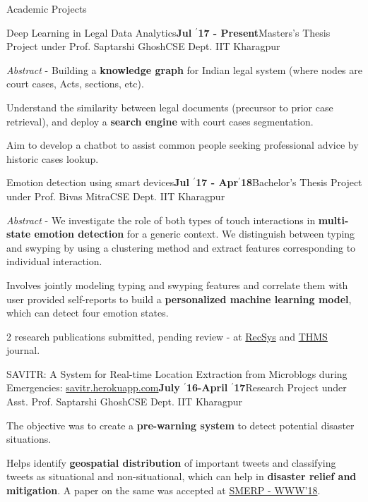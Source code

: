 \documentclass{resume} %
\begin{document}
\begin{rSection}{Academic Projects}

\begin{rSubsection}{ \large Deep Learning in Legal Data Analytics}{\textbf{\large Jul $^{\prime}$17 - Present}}{Masters's Thesis Project under Prof. Saptarshi Ghosh}{CSE Dept. IIT Kharagpur}
\item \textit{Abstract} - Building a \textbf{knowledge graph} for Indian legal system (where nodes are court cases, Acts, sections, etc).
\item Understand the similarity between legal documents (precursor to prior case retrieval), and deploy a \textbf{search engine} with court cases segmentation.
\item Aim to develop a chatbot to assist common people seeking professional advice by historic cases lookup.
\end{rSubsection}

\begin{rSubsection}{ \large Emotion detection using smart devices}{\textbf{\large Jul $^{\prime}$17 - Apr$^{\prime}$18}}{Bachelor's Thesis Project under Prof. Bivas Mitra}{CSE Dept. IIT Kharagpur}
\item \textit{Abstract} - We investigate the role of both types of touch interactions in \textbf{multi-state emotion detection} for a generic context. We distinguish between typing and swyping by using a clustering method and extract features corresponding to individual interaction.

\item Involves jointly modeling typing and swyping features and correlate them with user provided self-reports to build a \textbf{personalized machine learning model}, which can detect four emotion states.

\item 2 research publications submitted, pending review - at \href{https://recsys.acm.org/recsys18/}{RecSys} and \href{http://www.ieeesmc.org/publications/transactions-on-human-machine-systems}{THMS} journal.
\end{rSubsection}

\begin{rSubsection}{ \large SAVITR: A System for Real-time Location Extraction from Microblogs during Emergencies: \href{http://savitr.herokuapp.com}{savitr.herokuapp.com}}{\textbf{\large July $^{\prime}$16-April $^{\prime}$17}}{Research Project under Asst. Prof. Saptarshi Ghosh}{CSE Dept. IIT Kharagpur}
\item The objective was to create a \textbf{pre-warning system} to detect potential disaster situations. 
\item Helps identify \textbf{geospatial distribution} of important tweets and classifying tweets as situational and non-situational, which can help in \textbf{disaster relief and mitigation}. A paper on the same was accepted at \href{https://www.cse.iitk.ac.in/users/kripa/smerp2018/}{SMERP - WWW'18}.
\end{rSubsection}


\end{rSection}
\end{document}
